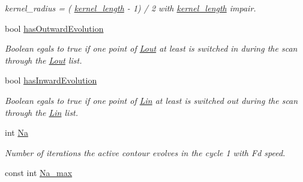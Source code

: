 \begin{DoxyCompactItemize}
\begin{DoxyCompactList}\small\item\em {\itshape kernel\-\_\-radius} = ( \hyperlink{classofeli_1_1_active_contour_a2b32161d0a9ac64a4e4f4c242fabe27c}{kernel\-\_\-length} -\/ 1) / 2 with \hyperlink{classofeli_1_1_active_contour_a2b32161d0a9ac64a4e4f4c242fabe27c}{kernel\-\_\-length} impair. \end{DoxyCompactList}\item 
\hypertarget{classofeli_1_1_active_contour_a9dcea2f4d6803007fe98e38152adf000}{bool \hyperlink{classofeli_1_1_active_contour_a9dcea2f4d6803007fe98e38152adf000}{has\-Outward\-Evolution}}\label{classofeli_1_1_active_contour_a9dcea2f4d6803007fe98e38152adf000}

\begin{DoxyCompactList}\small\item\em Boolean egals to {\ttfamily true} if one point of \hyperlink{classofeli_1_1_active_contour_a31e0eb18a7ea6ae90acf66ed018fcd85}{Lout} at least is switched in during the scan through the \hyperlink{classofeli_1_1_active_contour_a31e0eb18a7ea6ae90acf66ed018fcd85}{Lout} list. \end{DoxyCompactList}\item 
\hypertarget{classofeli_1_1_active_contour_af437460aa2cdf312166a3fe4d54beeb4}{bool \hyperlink{classofeli_1_1_active_contour_af437460aa2cdf312166a3fe4d54beeb4}{has\-Inward\-Evolution}}\label{classofeli_1_1_active_contour_af437460aa2cdf312166a3fe4d54beeb4}

\begin{DoxyCompactList}\small\item\em Boolean egals to {\ttfamily true} if one point of \hyperlink{classofeli_1_1_active_contour_a7662d4f5c8b87d3e642b08b7e341bd79}{Lin} at least is switched out during the scan through the \hyperlink{classofeli_1_1_active_contour_a7662d4f5c8b87d3e642b08b7e341bd79}{Lin} list. \end{DoxyCompactList}\item 
\hypertarget{classofeli_1_1_active_contour_a59f111cd0910d2e6534b51bb1da3c254}{int \hyperlink{classofeli_1_1_active_contour_a59f111cd0910d2e6534b51bb1da3c254}{Na}}\label{classofeli_1_1_active_contour_a59f111cd0910d2e6534b51bb1da3c254}

\begin{DoxyCompactList}\small\item\em Number of iterations the active contour evolves in the cycle 1 with {\itshape Fd} speed. \end{DoxyCompactList}\item 
\hypertarget{classofeli_1_1_active_contour_a811a28ec9c39400d244783a8a2fe7e2d}{const int \hyperlink{classofeli_1_1_active_contour_a811a28ec9c39400d244783a8a2fe7e2d}{Na\-\_\-max}}\label{classofeli_1_1_active_contour_a811a28ec9c39400d244783a8a2fe7e2d}


\end{DoxyCompactItemize}
